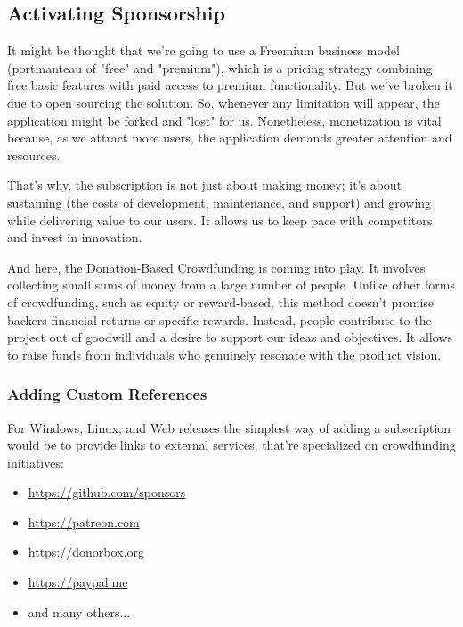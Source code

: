 
\subsection{Activating Sponsorship}

It might be thought that we're going to use a Freemium business model (portmanteau of "free" and "premium"), which is 
a pricing strategy combining free basic features with paid access to premium functionality. But we've broken it due to 
open sourcing the solution. So, whenever any limitation will appear, the application might be forked and "lost" 
for us. Nonetheless, monetization is vital because, as we attract more users, the application demands greater attention 
and resources.

That's why, the subscription is not just about making money; it's about sustaining (the costs of development, 
maintenance, and support) and growing while delivering value to our users. It allows us to keep pace with competitors 
and invest in innovation.

And here, the Donation-Based Crowdfunding is coming into play. It involves collecting small sums of money from a large 
number of people. Unlike other forms of crowdfunding, such as equity or reward-based, this method doesn't promise 
backers financial returns or specific rewards. Instead, people contribute to the project out of goodwill and a desire 
to support our ideas and objectives. It allows to raise funds from individuals who genuinely resonate with the 
product vision.

\subsubsection{Adding Custom References}

For Windows, Linux, and Web releases the simplest way of adding a subscription would be to provide links to external 
services, that're specialized on crowdfunding initiatives:

\begin{itemize}
  \item  \href{https://github.com/sponsors}{https://github.com/sponsors}
  \item  \href{https://patreon.com}{https://patreon.com}
  \item  \href{https://donorbox.org}{https://donorbox.org}
  \item  \href{https://paypal.me}{https://paypal.me}
  \item  and many others...
\end{itemize}

